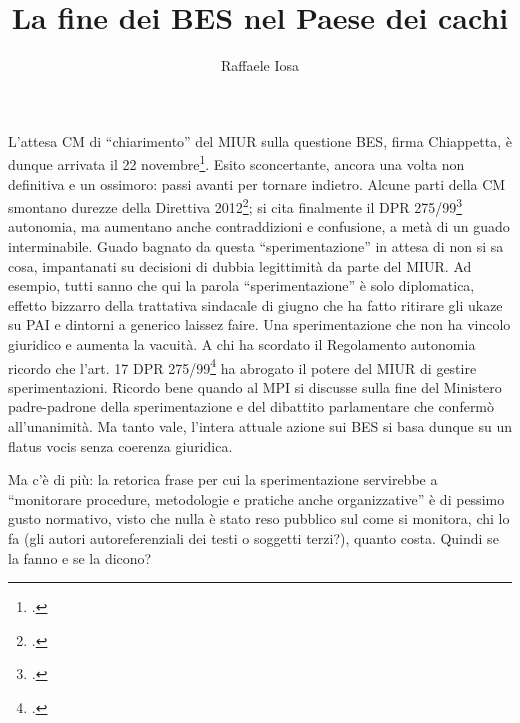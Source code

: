 \author{Raffaele Iosa}
\title{La fine dei BES nel Paese dei cachi}
\label{cha:Iosa281113}
\maketitle
{}

L'attesa CM di “chiarimento” del MIUR sulla questione BES, firma  Chiappetta, è dunque arrivata il 22 novembre\footcite{Nota_2563_2013}. Esito sconcertante, ancora una volta non definitiva e  un ossimoro: passi avanti per tornare indietro. Alcune parti della CM smontano durezze della Direttiva 2012\footcite{dir27Dic2012}; si cita finalmente il DPR 275/99\footcite{DPR_275_1999} autonomia, ma aumentano  anche contraddizioni e confusione,  a metà di un guado  interminabile. Guado bagnato  da questa  “sperimentazione”  in attesa di non si sa cosa, impantanati  su decisioni di dubbia legittimità da parte del MIUR. Ad esempio, tutti sanno che qui la parola “sperimentazione” è solo diplomatica, effetto bizzarro della trattativa sindacale di giugno che ha fatto ritirare gli ukaze su PAI e dintorni a generico laissez faire. Una sperimentazione che non ha vincolo giuridico e aumenta la vacuità. A chi ha scordato il Regolamento autonomia ricordo che l'art. 17  DPR 275/99\footcite{DPR_275_1999} ha abrogato il potere del MIUR di gestire sperimentazioni. Ricordo bene quando al MPI si discusse sulla fine del Ministero padre-padrone della sperimentazione e del dibattito parlamentare che confermò  all'unanimità.  Ma tanto vale, l'intera attuale azione sui BES si basa dunque su un flatus vocis senza coerenza giuridica.

Ma c'è di più: la retorica frase per cui la sperimentazione servirebbe a “monitorare procedure, metodologie e pratiche anche organizzative”  è di pessimo gusto normativo, visto che nulla è stato reso pubblico sul come si monitora, chi lo fa (gli autori autoreferenziali dei testi o soggetti terzi?), quanto costa. Quindi se la fanno e se la dicono?


